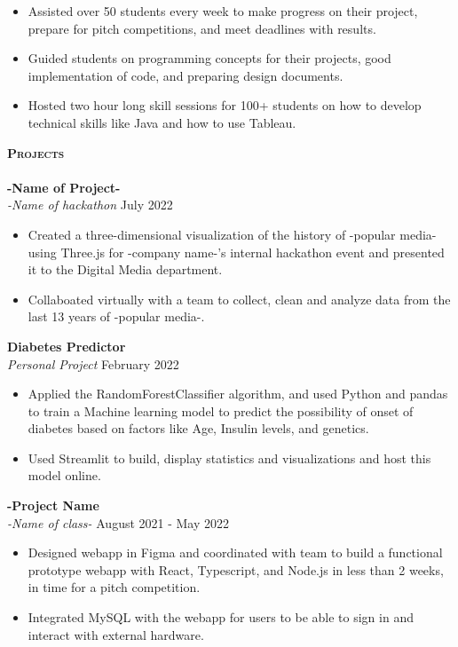 \documentclass[10pt, a4paper]{article}
\newcommand{\lineunder} {
    \vspace*{-8pt} \\
    \hspace*{-18pt} \hrulefill \\
}
\newcommand{\header} [1] {
    {\hspace*{-15pt}\vspace*{3pt} \textsc{#1}}
    \vspace*{-6pt} \lineunder
}
\begin{document}
{    \begin{itemize}
        \vspace{-2mm}
        \itemsep-0.05em
        \item Assisted over 50 students every week to make progress on their project, prepare for pitch competitions, and meet deadlines with results. 
        \item Guided students on programming concepts for their projects, good implementation of code, and preparing design documents.
        \item Hosted two hour long skill sessions for 100+ students on how to develop technical skills like Java and how to use Tableau.
    \end{itemize}


\header{\textbf{Projects}}
\textbf{-Name of Project-} \\ \textit{-Name of hackathon}
\hfill July 2022\\
\vspace{-2mm}
\begin{itemize}
    \itemsep-0.05em
    \item Created a three-dimensional visualization of the history of -popular media- using Three.js for -company name-'s internal hackathon event and presented it to the Digital Media department. 
    \item Collaboated virtually with a team to collect, clean and analyze data from the last 13 years of -popular media-.
\end{itemize}
\textbf{Diabetes Predictor} \\ \textit{Personal Project}
\hfill February 2022\\
\vspace{-2mm}
\begin{itemize}
    \itemsep-0.05em
    \item Applied the RandomForestClassifier algorithm, and used Python and pandas to train a Machine learning model to predict the possibility of onset of diabetes based on factors like Age, Insulin levels, and genetics.
    \item Used Streamlit to build, display statistics and visualizations and host this model online. 
\end{itemize}
\textbf{-Project Name} \\  \textit{-Name of class-} 
\hfill August 2021 - May 2022\\
\vspace{-2mm}
\begin{itemize}
    \itemsep-0.05em
    \item Designed webapp in Figma and coordinated with team to build a functional prototype webapp with React, Typescript, and Node.js in less than 2 weeks, in time for a pitch competition. 
    \item Integrated MySQL with the webapp for users to be able to sign in and interact with external hardware.
    

\end{itemize}}
\end{document}

